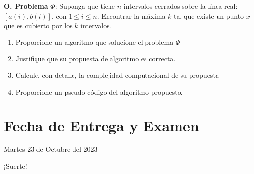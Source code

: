 \documentclass{article}
\begin{document}
\textbf{O. Problema} $\Phi$: Suponga que tiene $n$ intervalos cerrados sobre la línea real: $[a(i), b(i)]$, con $1 \leq i \leq n$. Encontrar la máxima $k$ tal que existe un punto $x$ que es cubierto por los $k$ intervalos.
\begin{enumerate}
\item Proporcione un algoritmo que solucione el problema $\Phi$.
\item Justifique que su propuesta de algoritmo es correcta.
\item Calcule, con detalle, la complejidad computacional de su propuesta
\item Proporcione un pseudo-código del algoritmo propuesto.
\end{enumerate}

\section{Fecha de Entrega y Examen}
Martes 23 de Octubre del 2023

¡Suerte!
\end{document}
